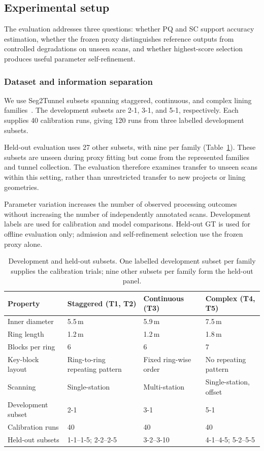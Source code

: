 \documentclass[a4paper,fleqn]{cas-dc}
\begin{document}
{\subsection{Experimental setup}
\label{sec:exp-setup}

The evaluation addresses three questions: whether PQ and SC support accuracy estimation, whether the frozen proxy distinguishes reference outputs from controlled degradations on unseen scans, and whether highest-score selection produces useful parameter self-refinement.


\subsubsection{Dataset and information separation}
\label{sec:dataset}

We use Seg2Tunnel subsets spanning staggered, continuous, and complex lining families~\cite{lin2024seg2tunnel}. The development subsets are 2-1, 3-1, and 5-1, respectively. Each supplies 40 calibration runs, giving 120 runs from three labelled development subsets.

Held-out evaluation uses 27 other subsets, with nine per family (Table~\ref{tab:dataset}). These subsets are unseen during proxy fitting but come from the represented families and tunnel collection. The evaluation therefore examines transfer to unseen scans within this setting, rather than unrestricted transfer to new projects or lining geometries.

Parameter variation increases the number of observed processing outcomes without increasing the number of independently annotated scans. Development labels are used for calibration and model comparisons. Held-out GT is used for offline evaluation only; admission and self-refinement selection use the frozen proxy alone.

\begin{table}[t]
\caption{Development and held-out subsets. One labelled development subset per family supplies the calibration trials; nine other subsets per family form the held-out panel.}
\label{tab:dataset}
\centering
\begin{tabular}{p{} p{} p{} p{}}
\toprule
Property & Staggered (T1, T2) & Continuous (T3) & Complex (T4, T5) \\
\midrule
Inner diameter & 5.5\,m & 5.9\,m & 7.5\,m \\
Ring length & 1.2\,m & 1.2\,m & 1.8\,m \\
Blocks per ring & 6 & 6 & 7 \\
Key-block layout & Ring-to-ring repeating pattern & Fixed ring-wise order & No repeating pattern \\
Scanning & Single-station & Multi-station & Single-station, offset \\
Development subset & 2-1 & 3-1 & 5-1 \\
Calibration runs & 40 & 40 & 40 \\
Held-out subsets & 1-1--1-5; 2-2--2-5 & 3-2--3-10 & 4-1--4-5; 5-2--5-5 \\
\bottomrule
\end{tabular}
\end{table}


}
\end{document}
